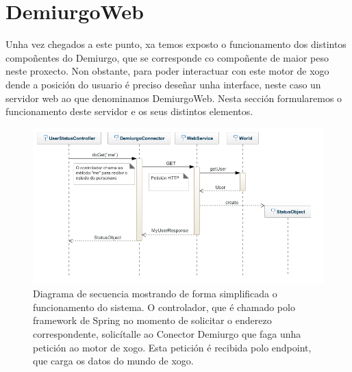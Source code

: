 \section{DemiurgoWeb}
Unha vez chegados a este punto, xa temos exposto o funcionamento dos distintos
compoñentes do Demiurgo, que se corresponde co compoñente de maior peso neste
proxecto. Non obstante, para poder interactuar con este motor de xogo dende a
posición do usuario é preciso deseñar unha interface, neste caso un servidor web
ao que denominamos DemiurgoWeb. Nesta sección formularemos o funcionamento deste
servidor e os seus distintos elementos.

\begin{figure}
\centerline{\includegraphics[width=1\textwidth]{figuras/diagramas/secuencia.png}}
\caption{Diagrama de secuencia mostrando de forma simplificada o funcionamento
do sistema. O controlador, que é chamado polo framework de Spring no momento de
solicitar o enderezo correspondente, solicítalle ao Conector Demiurgo que faga
unha petición ao motor de xogo. Esta petición é recibida polo endpoint, que
carga os datos do mundo de xogo.}
\label{fig:secuencia}
\end{figure}


